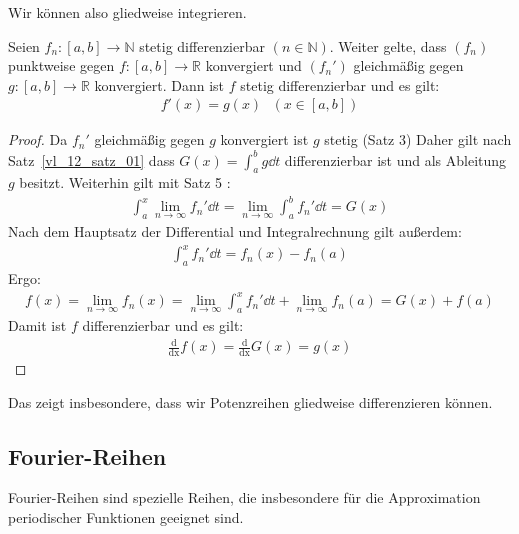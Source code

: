 \begin{Bemerkung}{
	Wir können also gliedweise integrieren.
}\end{Bemerkung}

\begin{Satz}{
	Seien $f_n : [a,b] \rightarrow \mathbb{N}$ stetig differenzierbar $(n \in 
	\mathbb{N})$. Weiter gelte, dass $(f_n)$ punktweise gegen $f:[a,b] \rightarrow 
	\mathbb{R}$ konvergiert und $(f_n')$ gleichmäßig gegen 
	$g:[a,b] \rightarrow \mathbb{R}$ konvergiert. Dann ist $f$ stetig 
	differenzierbar und es gilt:
	\begin{align*}
		f'(x) = g(x) \text{ } (x \in [a,b])
	\end{align*}
}\end{Satz}

\begin{proof}
	Da $f_n'$ gleichmäßig gegen $g$ konvergiert ist $g$ stetig (Satz 3) 
	Daher gilt nach Satz~\ref{vl_12_satz_01} dass 
	$G(x) = \int_a^b g \dd{t}$ differenzierbar ist und als Ableitung $g$ besitzt. 
	Weiterhin gilt mit Satz 5 :
	\begin{align*}
		\int_a^x \lim\limits_{n \rightarrow \infty}{f_n'} \dd{t} = 
		\lim\limits_{n\rightarrow \infty}{\int_a^b f_n' \dd{t}} = G(x)
	\end{align*}
	Nach dem Hauptsatz der Differential und Integralrechnung gilt außerdem:
	\begin{align*}
		\int_a^x f_n' \dd{t} = f_n(x) -f_n(a) 
	\end{align*}
	Ergo:
	\begin{align*}
		f(x) = \lim\limits_{n \rightarrow \infty}{f_n(x)} = 
		\lim\limits_{n \rightarrow \infty} \int_a^x f_n' \dd{t} + 
		\lim\limits_{n \rightarrow \infty}{f_n(a)} = G(x) + f(a)
	\end{align*}
	Damit ist $f$ differenzierbar und es gilt: 
	\begin{align*}
		\frac{\mathrm{d}}{\mathrm{dx}}f(x) 
	= \frac{\mathrm{d}}{\mathrm{dx}}G(x) = g(x)
	\end{align*}		
\end{proof}

\begin{Bemerkung}{
	Das zeigt insbesondere, dass wir Potenzreihen gliedweise differenzieren können.
}\end{Bemerkung}

\subsection{Fourier-Reihen}
Fourier-Reihen sind spezielle Reihen, die insbesondere für die Approximation 
periodischer Funktionen geeignet sind. 

